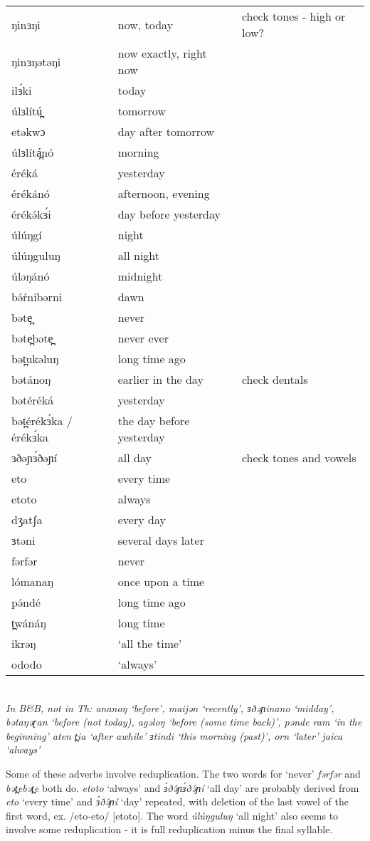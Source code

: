 \begin{supertabular}[t]{lll}
ŋinɜŋi		&	now, today			&	check tones - high or low?\\
ŋinɜŋətəŋi	&	now exactly, right now\\
ilɜ́ki		&	today\\
úlɜlítú̪		&	tomorrow\\
etəkwɔ		&	day after tomorrow\\
úlɜlítá̪nó	&	morning\\
éréká		&	yesterday\\
érékánó		&	afternoon, evening\\
érékə́kɜ́i		&	day before yesterday\\
úlúŋgí		&	night\\
úlúŋguluŋ	&	all night\\
úləŋánó		&	midnight\\
bə́ŕnibərni	&	dawn\\
bəte̪		&	never\\
bəte̪bəte̪	&	never ever\\
bət̪ukəluŋ	&	long time ago\\
bətánoŋ		&	earlier in the day		&	check dentals\\
bətéréká	&	yesterday\\
bət̪érékɜ́ka / érékɜ́ka	&	the day before yesterday\\
ɜðəɲɜ́ðəɲí	&	all day				&	check tones and vowels\\
eto			&	every time\\
etoto		&	always\\
dʒatʃa		&	every day\\
ɜtəni		&	several days later\\
fərfər		&	never\\
lómanaŋ		&	once upon a time\\
pə́ndé		&	long time ago\\
t̪wánáŋ		&	long time\\
ikrəŋ		&	‘all the time’\\
ododo		&	‘always’\\
\end{supertabular}\\

\textit{In B\&B, not in Th: ananoŋ ‘before’, maijən ‘recently’, ɜðəɲinano ‘midday’, bətaŋəɽan ‘before (not today), agəloŋ ‘before (some time back)’, pənde ram ‘in the beginning’ aten t̪ia ‘after awhile’ ɜtindi ‘this morning (past)’, orn ‘later’ jaica ‘always’}

Some of these adverbs involve reduplication. The two words for ‘never’ \textit{fərfər} and \textit{bət̪ebət̪e} both do. \textit{etoto} ‘always’ and \textit{ɜ́ðə́ɲɜ́ðə́ɲí} ‘all day’ are probably derived from \textit{eto} ‘every time’ and \textit{ɜ́ðə́ɲí} ‘day’ repeated, with deletion of the last vowel of the first word, ex. /eto-eto/  [etoto]. The word \textit{úlúŋguluŋ} ‘all night’ also seems to involve some reduplication - it is full reduplication minus the final syllable. 

